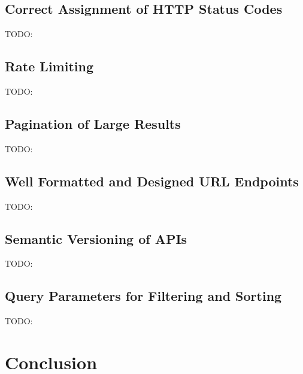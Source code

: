 \subsection{Correct Assignment of HTTP Status Codes}
TODO:

\subsection{Rate Limiting}
TODO:

\subsection{Pagination of Large Results}

TODO:

\subsection{Well Formatted and Designed URL Endpoints}

TODO:

\subsection{Semantic Versioning of APIs}

TODO:

\subsection{Query Parameters for Filtering and Sorting}
TODO:
\section{Conclusion}